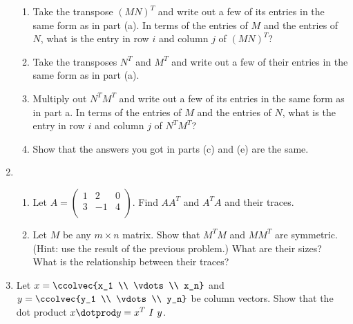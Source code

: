 \begin{enumerate}
\begin{enumerate}
\item Take the transpose \((MN)^T\) and write out a few of its entries in the same form as in part (a). In terms of the entries of \(M\) and the entries of \(N\), what is the entry in row \(i\) and column \(j\) of \((MN)^T\)?

\item Take the transposes \(N^T\) and \(M^T\) and write out a few of their entries in the same form as in part (a).

\item Multiply out \(N^TM^T\) and write out a few of its entries in the same form as in part a. In terms of the entries of \(M\) and the entries of \(N\), what is the entry in row \(i\) and column \(j\) of \(N^TM^T\)?

\item Show that the answers you got in parts (c) and (e) are the same.
\end{enumerate}


\item  
\begin{enumerate}
\item Let $A=\begin{pmatrix}
1 & 2 & 0\\
3 & -1 & 4\\
\end{pmatrix}$.  Find $AA^T$ and $A^TA$ and their traces.  \\
\item Let $M$ be any $m\times n$ matrix.  Show that $M^TM$ and $MM^T$ are symmetric. (Hint: use the result of the previous problem.)  What are their sizes? What is the relationship between their traces? 
\end{enumerate}


\item \label{mat_prob1} %
Let $x = \ccolvec{x_1 \\ \vdots \\ x_n}$ and $y = \ccolvec{y_1 \\ \vdots \\ y_n}$ be column vectors.  Show that the dot product $x \dotprod y = x^T\  I\  y$.




\end{enumerate}
